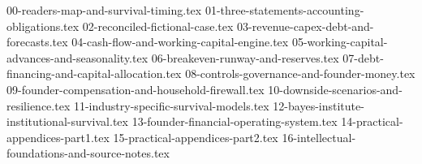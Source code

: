 
{00-readers-map-and-survival-timing.tex}
{01-three-statements-accounting-obligations.tex}
{02-reconciled-fictional-case.tex}
{03-revenue-capex-debt-and-forecasts.tex}
{04-cash-flow-and-working-capital-engine.tex}
{05-working-capital-advances-and-seasonality.tex}
{06-breakeven-runway-and-reserves.tex}
{07-debt-financing-and-capital-allocation.tex}
{08-controls-governance-and-founder-money.tex}
{09-founder-compensation-and-household-firewall.tex}
{10-downside-scenarios-and-resilience.tex}
{11-industry-specific-survival-models.tex}
{12-bayes-institute-institutional-survival.tex}
{13-founder-financial-operating-system.tex}
{14-practical-appendices-part1.tex}
{15-practical-appendices-part2.tex}
{16-intellectual-foundations-and-source-notes.tex}

